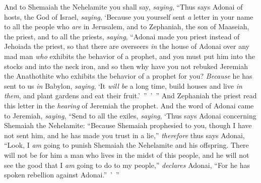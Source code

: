\begin{biblechapter}
 And to Shemaiah the Nehelamite you shall say, \textit{saying},
\verse “Thus says Adonai of hosts, the God of Israel, \textit{saying}, ‘Because you yourself sent \textit{a} letter in your name to all the people who \textit{are} in Jerusalem, and to Zephaniah, the son of Maaseiah, the priest, and to all the priests, \textit{saying},
\verse “Adonai made you priest instead of Jehoiada the priest, so that there are overseers \textit{in} the house of Adonai over any mad man \textit{who} exhibits the behavior of a prophet, and you must put him into the stocks and into the neck iron,
\verse and so then why have you not rebuked Jeremiah the Anathothite who exhibits the behavior of a prophet for you?
\verse \textit{Because} he has sent to us \textit{in} Babylon, \textit{saying}, ‘It \textit{will be} a long time, build houses and live \textit{in them}, and plant gardens and eat their fruit.’ ” ’ ”
\verse And Zephaniah the priest read this letter in the \textit{hearing} of Jeremiah the prophet.
 And the word of Adonai came to Jeremiah, \textit{saying},
\verse “Send to all the exiles, \textit{saying}, ‘Thus says Adonai concerning Shemaiah the Nehelamite: “Because Shemaiah prophesied to you, though I have not sent him, and he has made you trust in a lie,”
\verse \textit{therefore} thus says Adonai, “Look, I \textit{am} going to punish Shemaiah the Nehelamite and his offspring. There will not be for him a man who lives in the midst of this people, and he will not see the good that I \textit{am} going to do to my people,” \textit{declares} Adonai, “For he has spoken rebellion against Adonai.” ’ ”
\end{biblechapter}

